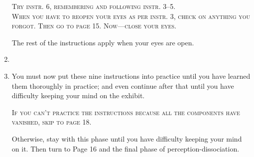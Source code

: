 \begin{enumerate}
		\vfill


		\vfill
\textsc{Try instr. 6, remembering and following instr. 3--5.} \\
\textsc{When you have to reopen your eyes as per instr. 3, check on anything you forgot.
	Then go to page 15. Now---close your eyes.}

\vfill

\clearpage
{}

The rest of the instructions apply when your eyes are open. 


\vfill

\item {}

\vfill
\item {}

\vfill
{}

\vfill

You must now put these nine instructions into practice until you have 
learned them thoroughly in practice; and even continue after that until you 
have difficulty keeping your mind on the exhibit. 

\vfill

\textsc{If you can't practice the instructions because all the components have vanished, skip to page 18.}

\vfill

Otherwise, stay with this phase until you have difficulty keeping your 
mind on it. Then turn to Page 16 and the final phase of 
perception-dissociation. 

\vfill
\end{enumerate}

